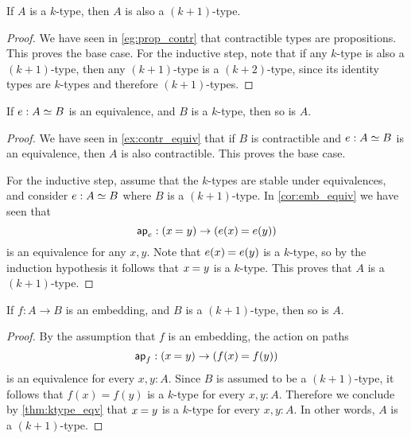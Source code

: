 
\begin{thm}\label{thm:istrunc_next}
If $A$ is a $k$-type, then $A$ is also a $(k+1)$-type.
\end{thm}

\begin{proof}
We have seen in \cref{eg:prop_contr} that contractible types are propositions. This proves the base case.
For the inductive step, note that if any $k$-type is also a $(k+1)$-type, then any $(k+1)$-type is a $(k+2)$-type, since its identity types are $k$-types and therefore $(k+1)$-types.
\end{proof}

\begin{thm}\label{thm:ktype_eqv}
If $e:\eqv{A}{B}$ is an equivalence, and $B$ is a $k$-type, then so is $A$.
\end{thm}

\begin{proof}
We have seen in \cref{ex:contr_equiv} that if $B$ is contractible and $e:\eqv{A}{B}$ is an equivalence, then $A$ is also contractible. This proves the base case.

For the inductive step, assume that the $k$-types are stable under equivalences, and consider $e:\eqv{A}{B}$ where $B$ is a $(k+1)$-type. In \cref{cor:emb_equiv} we have seen that
\begin{equation*}
\apfunc{e}:(\id{x}{y})\to(\id{e(x)}{e(y)})
\end{equation*}
is an equivalence for any $x,y$. Note that $\id{e(x)}{e(y)}$ is a $k$-type, so by the induction hypothesis it follows that $\id{x}{y}$ is a $k$-type. This proves that $A$ is a $(k+1)$-type.
\end{proof}

\begin{cor}\label{cor:emb_into_ktype}
If $f:A\to B$ is an embedding, and $B$ is a $(k+1)$-type, then so is $A$.
\end{cor}

\begin{proof}
By the assumption that $f$ is an embedding, the action on paths
\begin{equation*}
\apfunc{f}:(\id{x}{y})\to (\id{f(x)}{f(y)})
\end{equation*}
is an equivalence for every $x,y:A$. Since $B$ is assumed to be a $(k+1)$-type, it follows that $f(x)=f(y)$ is a $k$-type for every $x,y:A$. Therefore we conclude by \cref{thm:ktype_eqv} that $\id{x}{y}$ is a $k$-type for every $x,y:A$. In other words, $A$ is a $(k+1)$-type.
\end{proof}

